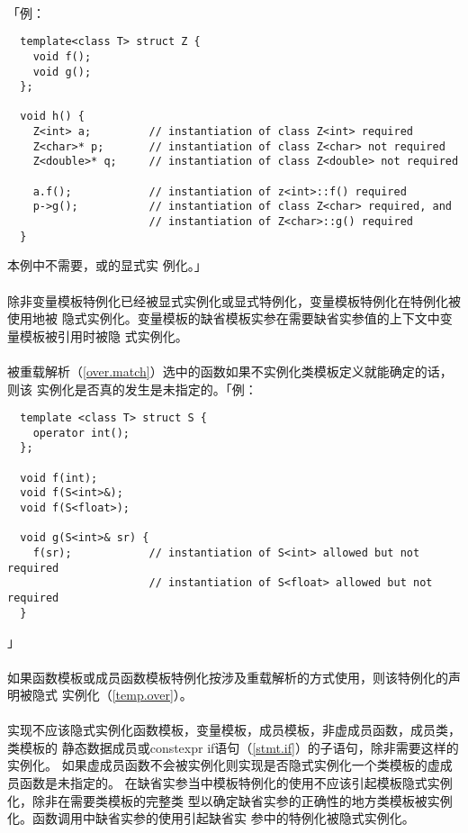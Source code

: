 \paragraph{}
「例：
\begin{lstlisting}
  template<class T> struct Z {
    void f();
    void g();
  };

  void h() {
    Z<int> a;         // instantiation of class Z<int> required
    Z<char>* p;       // instantiation of class Z<char> not required
    Z<double>* q;     // instantiation of class Z<double> not required

    a.f();            // instantiation of z<int>::f() required
    p->g();           // instantiation of class Z<char> required, and
                      // instantiation of Z<char>::g() required
  }
\end{lstlisting}
本例中不需要，或的显式实
例化。」

\paragraph{}
除非变量模板特例化已经被显式实例化或显式特例化，变量模板特例化在特例化被使用地被
隐式实例化。变量模板的缺省模板实参在需要缺省实参值的上下文中变量模板被引用时被隐
式实例化。

\paragraph{}
被重载解析（\ref{over.match}）选中的函数如果不实例化类模板定义就能确定的话，则该
实例化是否真的发生是未指定的。「例：
\begin{lstlisting}
  template <class T> struct S {
    operator int();
  };

  void f(int);
  void f(S<int>&);
  void f(S<float>);

  void g(S<int>& sr) {
    f(sr);            // instantiation of S<int> allowed but not required
                      // instantiation of S<float> allowed but not required
  }
\end{lstlisting}」

\paragraph{}
如果函数模板或成员函数模板特例化按涉及重载解析的方式使用，则该特例化的声明被隐式
实例化（\ref{temp.over}）。

\paragraph{}
实现不应该隐式实例化函数模板，变量模板，成员模板，非虚成员函数，成员类，类模板的
静态数据成员或constexpr if语句（\ref{stmt.if}）的子语句，除非需要这样的实例化。
如果虚成员函数不会被实例化则实现是否隐式实例化一个类模板的虚成员函数是未指定的。
在缺省实参当中模板特例化的使用不应该引起模板隐式实例化，除非在需要类模板的完整类
型以确定缺省实参的正确性的地方类模板被实例化。函数调用中缺省实参的使用引起缺省实
参中的特例化被隐式实例化。

